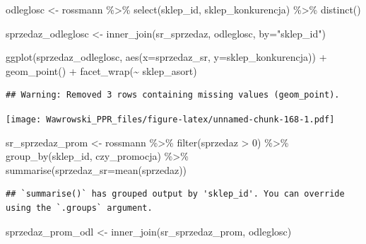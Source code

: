 \documentclass[
]{book}
\newenvironment{Shaded}{\begin{snugshade}}{\end{snugshade}}
\newcommand{\AttributeTok}[1]{\textcolor[rgb]{0.77,0.63,0.00}{#1}}
\newcommand{\DecValTok}[1]{\textcolor[rgb]{0.00,0.00,0.81}{#1}}
\newcommand{\FunctionTok}[1]{\textcolor[rgb]{0.00,0.00,0.00}{#1}}
\newcommand{\NormalTok}[1]{#1}
\newcommand{\OtherTok}[1]{\textcolor[rgb]{0.56,0.35,0.01}{#1}}
\newcommand{\SpecialCharTok}[1]{\textcolor[rgb]{0.00,0.00,0.00}{#1}}
\newcommand{\StringTok}[1]{\textcolor[rgb]{0.31,0.60,0.02}{#1}}
\begin{document}
\begin{Shaded}
\begin{Highlighting}[]
\NormalTok{odleglosc }\OtherTok{\textless{}{-}}\NormalTok{ rossmann }\SpecialCharTok{\%\textgreater{}\%}
  \FunctionTok{select}\NormalTok{(sklep\_id, sklep\_konkurencja) }\SpecialCharTok{\%\textgreater{}\%}
  \FunctionTok{distinct}\NormalTok{()}

\NormalTok{sprzedaz\_odleglosc }\OtherTok{\textless{}{-}} \FunctionTok{inner\_join}\NormalTok{(sr\_sprzedaz, odleglosc, }\AttributeTok{by=}\StringTok{"sklep\_id"}\NormalTok{)}

\FunctionTok{ggplot}\NormalTok{(sprzedaz\_odleglosc, }\FunctionTok{aes}\NormalTok{(}\AttributeTok{x=}\NormalTok{sprzedaz\_sr, }\AttributeTok{y=}\NormalTok{sklep\_konkurencja)) }\SpecialCharTok{+} 
  \FunctionTok{geom\_point}\NormalTok{() }\SpecialCharTok{+}
  \FunctionTok{facet\_wrap}\NormalTok{(}\SpecialCharTok{\textasciitilde{}}\NormalTok{ sklep\_asort)}
\end{Highlighting}
\end{Shaded}

\begin{verbatim}
## Warning: Removed 3 rows containing missing values (geom_point).
\end{verbatim}

\texttt{[image: Wawrowski\_PPR\_files/figure-latex/unnamed-chunk-168-1.pdf]}

\begin{Shaded}
\begin{Highlighting}[]
\NormalTok{sr\_sprzedaz\_prom }\OtherTok{\textless{}{-}}\NormalTok{ rossmann }\SpecialCharTok{\%\textgreater{}\%}
  \FunctionTok{filter}\NormalTok{(sprzedaz }\SpecialCharTok{\textgreater{}} \DecValTok{0}\NormalTok{) }\SpecialCharTok{\%\textgreater{}\%}
  \FunctionTok{group\_by}\NormalTok{(sklep\_id, czy\_promocja) }\SpecialCharTok{\%\textgreater{}\%}
  \FunctionTok{summarise}\NormalTok{(}\AttributeTok{sprzedaz\_sr=}\FunctionTok{mean}\NormalTok{(sprzedaz))}
\end{Highlighting}
\end{Shaded}

\begin{verbatim}
## `summarise()` has grouped output by 'sklep_id'. You can override using the `.groups` argument.
\end{verbatim}

\begin{Shaded}
\begin{Highlighting}[]
\NormalTok{sprzedaz\_prom\_odl }\OtherTok{\textless{}{-}} \FunctionTok{inner\_join}\NormalTok{(sr\_sprzedaz\_prom, odleglosc)}
\end{Highlighting}
\end{Shaded}
\end{document}
